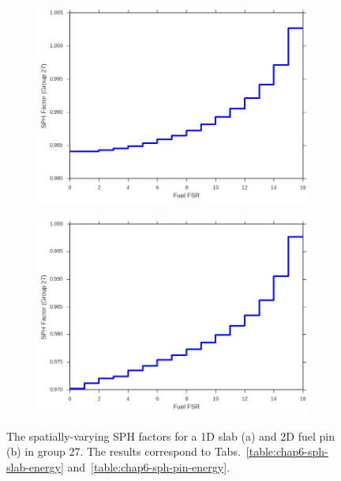 \begin{figure}[h!]
\begin{subfigure}{.9\textwidth}
  \centering
  \includegraphics[width=0.9\linewidth]{figures/sph/slab/sph-fuel-fsrs}
  \caption{}
\end{subfigure}
\begin{subfigure}{.9\textwidth}
  \centering
  \includegraphics[width=0.9\linewidth]{figures/sph/pin-cell/sph-fuel-fsrs}
  \caption{}
\end{subfigure}
\caption[SPH factors by FSR]{The spatially-varying \ac{SPH} factors for a 1D slab (a) and 2D fuel pin (b) in group 27. The results correspond to Tabs.~\ref{table:chap6-sph-slab-energy} and~\ref{table:chap6-sph-pin-energy}.}
\label{fig:chap6-sph-space}
\end{figure}

